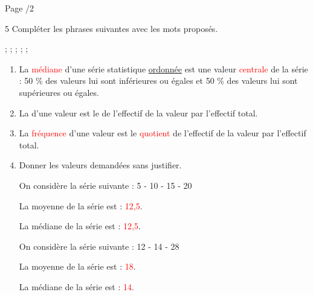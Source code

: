 \documentclass[a4paper]{book}
\begin{document}
{\vfill
Page \thepage/2  \hfill \text{ }


\newpage
\setcounter{exo}{1}
\setcounter{page}{1}

           

    \begin{exerciceNote}{5}
        Compléter les phrases suivantes avec les mots proposés.

         ;\;  ;\;  ;\;   ;\;  ;\; 

        
        \begin{enumerate}
            \item La \textcolor{red}{médiane} d'une série statistique \underline{ordonnée} est une valeur \textcolor{red}{centrale} de la série : 50 \% des valeurs lui sont inférieures ou égales et 50 \% des valeurs lui sont supérieures ou égales.

            \medskip

            \item La \points[5] d'une valeur est le \points[5] de l'effectif de la valeur par l'effectif total.

            \medskip

            \item La \textcolor{red}{fréquence} d'une valeur est le \textcolor{red}{quotient} de l'effectif de la valeur par l'effectif total.

            \medskip


            \item Donner les valeurs demandées sans justifier. 

            \begin{minipage}{0.45\linewidth}
                On considère la série suivante : 5 - 10 - 15 - 20

                La moyenne de la série est : \textcolor{red}{12,5}.

                La médiane de la série est : \textcolor{red}{12,5}.
            \end{minipage}
            \hfill
            \vline
            \hfill
            \begin{minipage}{0.45\linewidth}
                On considère la série suivante : 12 - 14 - 28
                
                La moyenne de la série est : \textcolor{red}{18}.

                La médiane de la série est : \textcolor{red}{14}.
            \end{minipage}
        \end{enumerate}
    \end{exerciceNote}


}
\end{document}
